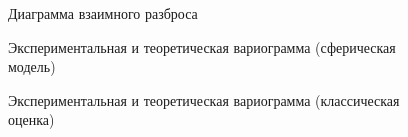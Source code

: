 \begin{figure}[H]
\caption{Диаграмма взаимного разброса}
\label{img:hscat}
\end{figure}

\begin{figure}[H]
\caption{Экспериментальная и теоретическая вариограмма (сферическая модель)}
\label{img:manual-variogram}
\end{figure}

\begin{figure}[H]
\caption{Экспериментальная и теоретическая вариограмма (классическая оценка)}
\label{img:classical-variogram}
\end{figure}

